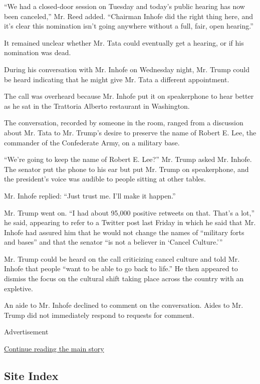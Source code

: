 ``We had a closed-door session on Tuesday and today's public hearing has
now been canceled,'' Mr. Reed added. ``Chairman Inhofe did the right
thing here, and it's clear this nomination isn't going anywhere without
a full, fair, open hearing.''

It remained unclear whether Mr. Tata could eventually get a hearing, or
if his nomination was dead.

During his conversation with Mr. Inhofe on Wednesday night, Mr. Trump
could be heard indicating that he might give Mr. Tata a different
appointment.

The call was overheard because Mr. Inhofe put it on speakerphone to hear
better as he sat in the Trattoria Alberto restaurant in Washington.

The conversation, recorded by someone in the room, ranged from a
discussion about Mr. Tata to Mr. Trump's desire to preserve the name of
Robert E. Lee, the commander of the Confederate Army, on a military
base.

``We're going to keep the name of Robert E. Lee?'' Mr. Trump asked Mr.
Inhofe. The senator put the phone to his ear but put Mr. Trump on
speakerphone, and the president's voice was audible to people sitting at
other tables.

Mr. Inhofe replied: ``Just trust me. I'll make it happen.''

Mr. Trump went on. ``I had about 95,000 positive retweets on that.
That's a lot,'' he said, appearing to refer to a Twitter post last
Friday in which he said that Mr. Inhofe had assured him that he would
not change the names of ``military forts and bases'' and that the
senator ``is not a believer in `Cancel Culture.'''

Mr. Trump could be heard on the call criticizing cancel culture and told
Mr. Inhofe that people ``want to be able to go back to life.'' He then
appeared to dismiss the focus on the cultural shift taking place across
the country with an expletive.

An aide to Mr. Inhofe declined to comment on the conversation. Aides to
Mr. Trump did not immediately respond to requests for comment.

Advertisement

\protect\hyperlink{after-bottom}{Continue reading the main story}

\hypertarget{site-index}{%
\subsection{Site Index}\label{site-index}}

